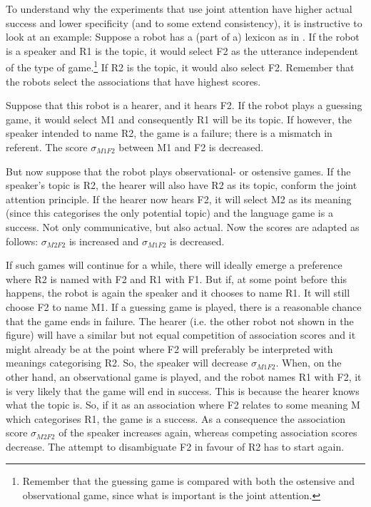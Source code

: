 To understand why the experiments that use joint attention have higher actual success and lower specificity (and to some extend consistency), it is instructive to look at an example: Suppose a robot has a (part of a) lexicon as in . If the robot is a speaker and R1 is the topic, it would select F2 as the utterance independent of the type of game.\footnote{Remember that the guessing game is compared with both the ostensive and observational game, since what is important is the joint attention.} If R2 is the topic, it would also select F2. Remember that the robots select the associations that have highest scores.

Suppose that this robot is a hearer, and it hears F2. If the robot plays a guessing game, it would select M1 and consequently R1 will be its topic. If however, the speaker intended to name R2, the game is a failure; there is a mismatch in referent. The score $\sigma_{M1F2}$ between M1 and F2 is decreased.

But now suppose that the robot plays observational- or ostensive games. If the speaker's topic is R2, the hearer will also have R2 as its topic, conform the joint attention principle. If the hearer now hears F2, it will select M2 as its meaning (since this categorises the only potential topic) and the language game is a success. Not only communicative, but also actual. Now the scores are adapted as follows: $\sigma_{M2F2}$ is increased and $\sigma_{M1F2}$ is decreased.

If such games will continue for a while, there will ideally emerge a preference where R2 is named with F2 and R1 with F1. But if, at some point before this happens, the robot is again the speaker and it chooses to name R1. It will still choose F2 to name M1.  If a guessing game is played, there is a reasonable chance that the game ends in failure. The hearer (i.e. the other robot not shown in the figure) will have a similar but not equal competition of association scores and it might already be at the point where F2 will preferably be interpreted with meanings categorising R2. So, the speaker will decrease $\sigma_{M1F2}$. When, on the other hand, an observational game is played, and the robot names R1 with F2, it is very likely that the game will end in success. This is because the hearer knows what the topic is. So, if it as an association where F2 relates to some meaning M which categorises R1, the game is a success. As a consequence the association score $\sigma_{M2F2}$ of the speaker increases again, whereas competing association scores decrease. The attempt to disambiguate F2 in favour of R2 has to start again.

